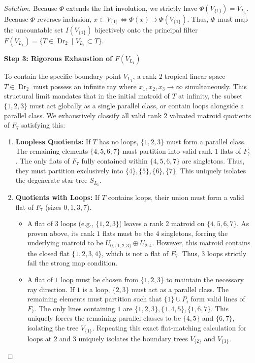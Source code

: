 \documentclass[12pt]{article}
\DeclareMathOperator{\Dr}{Dr}
\begin{document}
\begin{proof}[Solution]
Because $\Phi$ extends the flat involution, we strictly have $\Phi(V_{\{1\}}) = V_{L_1}$. Because $\Phi$ reverses inclusion, $x \subset V_{\{1\}} \iff \Phi(x) \supset \Phi(V_{\{1\}})$. Thus, $\Phi$ must map the uncountable set $I(V_{\{1\}})$ bijectively onto the principal filter $F(V_{L_1}) = \{ T \in \Dr_2 \mid V_{L_1} \subset T \}$.

\medskip
\noindent \textbf{Step 3: Rigorous Exhaustion of $F(V_{L_1})$}

To contain the specific boundary point $V_{L_1}$, a rank $2$ tropical linear space $T \in \Dr_2$ must possess an infinite ray where $x_1, x_2, x_3 \to \infty$ simultaneously. This structural limit mandates that in the initial matroid of $T$ at infinity, the subset $\{1,2,3\}$ must act globally as a single parallel class, or contain loops alongside a parallel class. We exhaustively classify all valid rank $2$ valuated matroid quotients of $F_7$ satisfying this:

\begin{enumerate}
    \item \textbf{Loopless Quotients:} If $T$ has no loops, $\{1,2,3\}$ must form a parallel class. The remaining elements $\{4,5,6,7\}$ must partition into valid rank $1$ flats of $F_7$. The only flats of $F_7$ fully contained within $\{4,5,6,7\}$ are singletons. Thus, they must partition exclusively into $\{4\}, \{5\}, \{6\}, \{7\}$. This uniquely isolates the degenerate star tree $S_{L_1}$.
    \item \textbf{Quotients with Loops:} If $T$ contains loops, their union must form a valid flat of $F_7$ (sizes $0, 1, 3, 7$). 
    \begin{itemize}
        \item A flat of $3$ loops (e.g., $\{1,2,3\}$) leaves a rank $2$ matroid on $\{4,5,6,7\}$. As proven above, its rank $1$ flats must be the $4$ singletons, forcing the underlying matroid to be $U_{0,\{1,2,3\}} \oplus U_{2,4}$. However, this matroid contains the closed flat $\{1,2,3,4\}$, which is not a flat of $F_7$. Thus, $3$ loops strictly fail the strong map condition.
        \item A flat of $1$ loop must be chosen from $\{1,2,3\}$ to maintain the necessary ray direction. If $1$ is a loop, $\{2,3\}$ must act as a parallel class. The remaining elements must partition such that $\{1\} \cup P_i$ form valid lines of $F_7$. The only lines containing $1$ are $\{1,2,3\}, \{1,4,5\}, \{1,6,7\}$. This uniquely forces the remaining parallel classes to be $\{4,5\}$ and $\{6,7\}$, isolating the tree $V_{\{1\}}$. Repeating this exact flat-matching calculation for loops at $2$ and $3$ uniquely isolates the boundary trees $V_{\{2\}}$ and $V_{\{3\}}$.
    \end{itemize}
\end{enumerate}


\end{proof}
\end{document}
